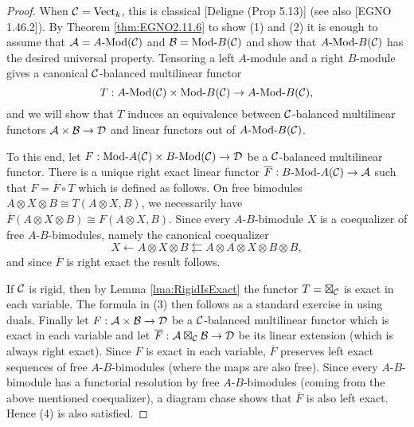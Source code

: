 \documentclass{amsart}
\begin{document}
\begin{proof}
	When $\mathcal C = \mathrm{Vect}_k$, this is classical [Deligne (Prop 5.13)] (see also [EGNO 1.46.2]).
	By Theorem \ref{thm:EGNO2.11.6} to show (1) and (2) it is enough to assume that $\cA = \Mod{A}{}(\cC)$ and $\cB = \Mod{}{B}(\cC)$ and show that $\Mod{A }{B}(\cC)$ has the desired universal property. Tensoring a left $A$-module and a right $B$-module gives a canonical $\mathcal C$-balanced multilinear functor 
		\begin{equation*}
			T: \Mod{A}{}(\cC) \times \Mod{}{B}(\cC) \to \Mod{A}{B}(\cC),  
		\end{equation*}
and we will show that $T$ induces an equivalence between $\mathcal C$-balanced multilinear functors $\mathcal A \times \mathcal B \to \mathcal D$ and linear functors out of $\Mod{A}{B}(\cC)$.
	
	To this end, let $F:\Mod{}{A}(\cC) \times \Mod{B}{}(\cC) \to \cD$ be a $\mathcal C$-balanced multilinear functor.  
	There is a unique right exact linear functor $\overline F: \Mod{B}{A}(\cC) \to \cA$ such that $F = \overline{F} \circ T$ which is defined as follows. On free bimodules $A \otimes X \otimes B \cong T(A \otimes X, B)$, we necessarily have $\overline{F}(A \otimes X \otimes B) \cong F(A \otimes X, B)$. Since  every $A$-$B$-bimodule $X$ is a coequalizer of free $A$-$B$-bimodules, namely the canonical coequalizer  
	\begin{equation*}
		X \leftarrow A \otimes X \otimes B \leftleftarrows A \otimes A \otimes X \otimes B \otimes B,
	\end{equation*}
	and since $\overline{F}$ is right exact the result follows.
	
	If $\mathcal C$ is rigid, then by Lemma \ref{lma:RigidIsExact} the functor $T = \boxtimes_{\mathcal C}$ is exact in each variable. The formula in (3) then follows as a standard exercise in using duals. Finally let $F: \mathcal A \times \mathcal B \to \mathcal D$ be a $\mathcal C$-balanced multilinear functor which is exact in each variable and let $\overline{F}: \mathcal A \boxtimes_\mathcal C \mathcal B \to \mathcal D$ be its linear extension (which is always right exact). Since $F$ is exact in each variable, $\overline{F}$ preserves left exact sequences of free $A$-$B$-bimodules (where the maps are also free). Since every $A$-$B$-bimodule has a functorial resolution by free $A$-$B$-bimodules (coming from the above mentioned coequalizer), a diagram chase shows that $\overline{F}$ is also left exact. Hence (4) is also satisfied. 
\end{proof}
\end{document}
